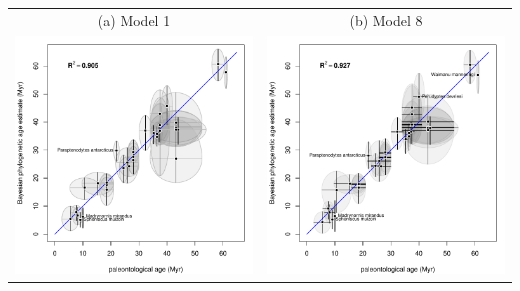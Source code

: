 \documentclass{standalone}
\begin{document}
\begin{tabular}{cc}
(a) Model 1 & (b) Model 8 \\
\includegraphics[width=7cm]{run1_2/1_phyloAgeVsGeoAge.pdf} 
& 
\includegraphics[width=7cm]{penguins_8/8_phyloAgeVsGeoAge.pdf}
\\
\end{tabular}
\end{document}
